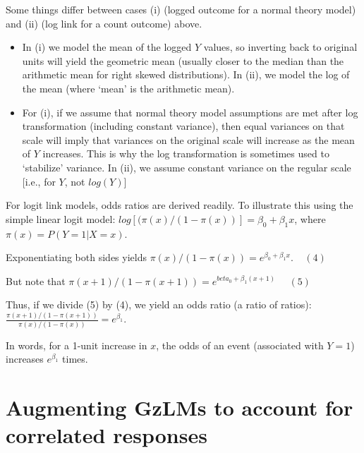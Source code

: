 \documentclass[
  9pt,
  ignorenonframetext,
]{beamer}
\begin{document}
\begin{frame}{}
\protect\hypertarget{section-2}{}
Some things differ between cases (i) (logged outcome for a normal theory
model) and (ii) (log link for a count outcome) above.

\begin{itemize}
\item
  In (i) we model the mean of the logged \(Y\) values, so inverting back
  to original units will yield the geometric mean (usually closer to the
  median than the arithmetic mean for right skewed distributions). In
  (ii), we model the log of the mean (where `mean' is the arithmetic
  mean).
\item
  For (i), if we assume that normal theory model assumptions are met
  after log transformation (including constant variance), then equal
  variances on that scale will imply that variances on the original
  scale will increase as the mean of \(Y\) increases. This is why the
  log transformation is sometimes used to `stabilize' variance. In (ii),
  we assume constant variance on the regular scale {[}i.e., for \(Y\),
  not \(log(Y)\){]}
\end{itemize}
\end{frame}

\begin{frame}{}
\protect\hypertarget{section-3}{}
For logit link models, odds ratios are derived readily. To illustrate
this using the simple linear logit model:
\(log[(\pi (x)/(1-\pi (x))]= \beta_0+ \beta_1 x\), where
\(\pi (x)=P(Y=1|X=x)\).

Exponentiating both sides yields
\(\pi (x)/(1-\pi (x))=e^{\beta_0+ \beta_1 x}. \ \ \ \ \ (4)\)

But note that
\(\pi (x+1)/(1-\pi (x+1))=e^{beta_0+ \beta_1 (x+1)} \ \ \ \ \ \ (5)\)

Thus, if we divide (5) by (4), we yield an odds ratio (a ratio of
ratios):
\(\frac {\pi (x+1)/(1-\pi (x+1))} {\pi (x)/(1-\pi (x))} = e^{\beta_1}\).

In words, for a 1-unit increase in \(x\), the odds of an event
(associated with \(Y=1\)) increases \(e^{\beta_1}\) times.
\end{frame}

\hypertarget{augmenting-gzlms-to-account-for-correlated-responses}{%
\section{Augmenting GzLMs to account for correlated
responses}\label{augmenting-gzlms-to-account-for-correlated-responses}}
\end{document}
